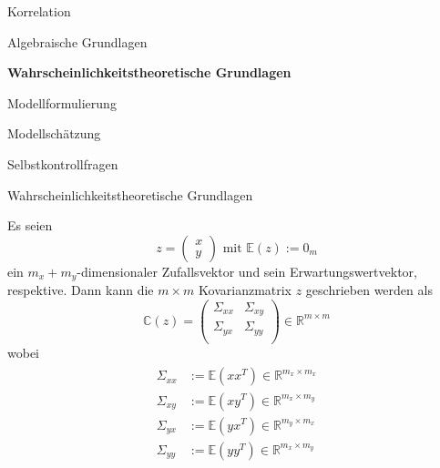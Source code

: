 \documentclass[
  8pt,
  ignorenonframetext,
]{beamer}
\begin{document}
\begin{frame}{}
\protect\hypertarget{section-6}{}
\vfill
\large

Korrelation

Algebraische Grundlagen

\textbf{Wahrscheinlichkeitstheoretische Grundlagen}

Modellformulierung

Modellschätzung

Selbstkontrollfragen \vfill
\end{frame}

\begin{frame}{Wahrscheinlichkeitstheoretische Grundlagen}
\protect\hypertarget{wahrscheinlichkeitstheoretische-grundlagen}{}
\footnotesize
\begin{theorem}
\normalfont
\justifying
Es seien
\begin{equation}
z = \begin{pmatrix} x \\ y\end{pmatrix}
\mbox{ mit }
\mathbb{E}(z)  := 0_m
\end{equation}
ein $m_x + m_y$-dimensionaler Zufallsvektor und sein Erwartungswertvektor,
respektive. Dann kann die $m \times m$ Kovarianzmatrix  $z$ geschrieben werden als
\begin{equation}
\mathbb{C}(z) =
\begin{pmatrix}
\Sigma_{xx} & \Sigma_{xy} \\
\Sigma_{yx} & \Sigma_{yy} \\
\end{pmatrix}
\in \mathbb{R}^{m \times m}
\end{equation}
wobei
\begin{align}
\begin{split}
\Sigma_{xx} & := \mathbb{E}\left(xx^T\right) \in \mathbb{R}^{m_x \times m_x}\\
\Sigma_{xy} & := \mathbb{E}\left(xy^T\right) \in \mathbb{R}^{m_x \times m_y}\\
\Sigma_{yx} & := \mathbb{E}\left(yx^T\right) \in \mathbb{R}^{m_y \times m_x}\\
\Sigma_{yy} & := \mathbb{E}\left(yy^T\right) \in \mathbb{R}^{m_x \times m_y}
\end{split}
\end{align}
\end{theorem}
\end{frame}
\end{document}
